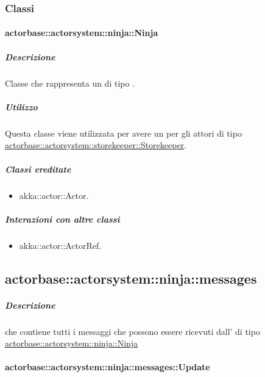 \documentclass{scalatekids-article}
\begin{document}
\subsubsection{Classi}

\paragraph{actorbase::actorsystem::ninja::Ninja}
\label{sec:actorbase::actorsystem::ninja::Ninja}

\subparagraph{Descrizione}

Classe che rappresenta un  di tipo .

\subparagraph{Utilizzo}

Questa classe viene utilizzata per avere un  per gli attori di tipo
\hyperref[sec:actorbase::actorsystem::storekeeper::Storekeeper]{actorbase::actorsystem::storekeeper::Storekeeper}.

\subparagraph{Classi ereditate}

\begin{itemize}

\item akka::actor::Actor.

\end{itemize}

\subparagraph{Interazioni con altre classi}

\begin{itemize}
\item akka::actor::ActorRef.
\end{itemize}

\subsection{actorbase::actorsystem::ninja::messages}
\label{sec:actorbase::actorsystem::ninja::messages}

\subparagraph{Descrizione}

 che contiene tutti i messaggi che possono essere ricevuti
dall' di tipo
\hyperref[sec:actorbase::actorsystem::ninja::Ninja]{actorbase::actorsystem::ninja::Ninja}

\paragraph{actorbase::actorsystem::ninja::messages::Update}
\label{sec:actorbase::actorsystem::ninja::messages::Update}
\end{document}
